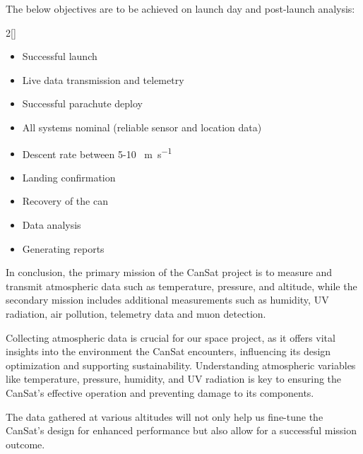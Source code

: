 The below objectives are to be achieved on launch day and post-launch analysis:
\begin{multicols}{2}[\vspace{-0.75\baselineskip}]
\begin{itemize}[leftmargin=1cm,itemindent=0.5cm, noitemsep, topsep=2pt, label=]
    \item Successful launch
    \item Live data transmission and  telemetry
    \item Successful parachute deploy
    \item All systems nominal (reliable sensor and location data)
    \item Descent rate between 5-10 \SI{}{\meter\per\second}
    \item Landing confirmation
    \item Recovery of the can
    \item Data analysis
    \item Generating reports
\end{itemize}
\end{multicols}

In conclusion, the primary mission of the CanSat project is to measure and transmit atmospheric data such as temperature, pressure, and altitude, while the secondary mission includes additional measurements such as humidity, UV radiation, air pollution, telemetry data and muon detection. 


Collecting atmospheric data is crucial for our space project, as it offers vital insights into the environment the CanSat encounters, influencing its design optimization and supporting sustainability. Understanding atmospheric variables like temperature, pressure, humidity, and UV radiation is key to ensuring the CanSat's effective operation and preventing damage to its components.

The data gathered at various altitudes will not only help us fine-tune the CanSat's design for enhanced performance but also allow for a successful mission outcome.